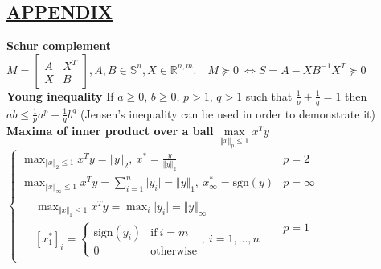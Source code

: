 \documentclass[a4paper]{article}
\begin{document}
\subsection*{\underline{APPENDIX}}
\textbf{Schur complement} $M=\begin{bmatrix}
    A&X^T\\
    X&B
\end{bmatrix}, A,B\in\mathbb{S}^n, X \in \mathbb{R}^{n,m}. \quad M\succeq0 \  \iff S=A-XB^{-1}X^T\succeq0$  \\
\textbf{Young inequality} If $a\ge0$, $b\ge0$, $p>1$, $q>1$ such that $\frac{1}{p}+\frac{1}{q}=1$ then $ab \le \frac{1}{p}{a^p}+\frac{1}{q}{b^q}$ \textsf{(Jensen's inequality can be used in order to demonstrate it)}\\
\textbf{Maxima of inner product over a ball} $\underset{\Vert x \Vert_p \le 1}{\max} x^Ty$ $\begin{cases}
    \max_{\Vert x \Vert_2\le1}{x^T{y}}=\Vert{y}\Vert_2, \ x^{*}=\frac{y}{\Vert{y}\Vert_2}&{p=2}\\
    \max_{\Vert{x}\Vert_\infty\le1}{x^T{y}}=\sum_{i=1}^{n}{\vert{y_i}\vert}=\Vert{y}\Vert_1, \ x^{*}_\infty=\text{sgn}(y)&{p=\infty}\\
    \begin{aligned}
        &\max_{\Vert{x}\Vert_1\le{1}}{x^T{y}}=\max_i{\vert{y_i}\vert}=\Vert{y}\Vert_\infty \\
        &[x_1^{*}]_i=\begin{cases}
           \text{sign}(y_i)&\text{if} \ i=m\\
           0&\text{otherwise}
       \end{cases}, \ i=1,...,n
    \end{aligned}&p=1
   
\end{cases}$
\end{document}
